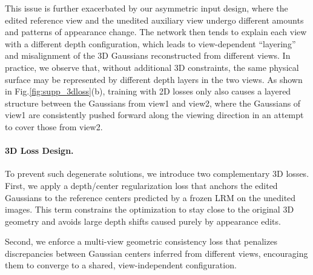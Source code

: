 This issue is further exacerbated by our asymmetric input design, where the edited reference view and the unedited auxiliary view undergo different amounts and patterns of appearance change. The network then tends to explain each view with a different depth configuration, which leads to view-dependent ``layering'' and misalignment of the 3D Gaussians reconstructed from different views. In practice, we observe that, without additional 3D constraints, the same physical surface may be represented by different depth layers in the two views. 
As shown in Fig.\ref{fig:supp_3dloss}(b), training with 2D losses only also causes a layered structure between the Gaussians from view1 and view2, where the Gaussians of view1 are consistently pushed forward along the viewing direction in an attempt to cover those from view2.

\paragraph{3D Loss Design.}
To prevent such degenerate solutions, we introduce two complementary 3D losses. First, we apply a depth/center regularization loss that anchors the edited Gaussians to the reference centers predicted by a frozen LRM on the unedited images. This term constrains the optimization to stay close to the original 3D geometry and avoids large depth shifts caused purely by appearance edits. 

Second, we enforce a multi-view geometric consistency loss that penalizes discrepancies between Gaussian centers inferred from different views, encouraging them to converge to a shared, view-independent configuration.




